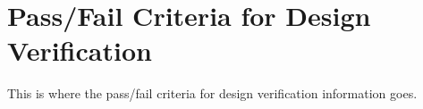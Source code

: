 \section{Pass/Fail Criteria for Design Verification}
This is where the pass/fail criteria for design verification information goes.
